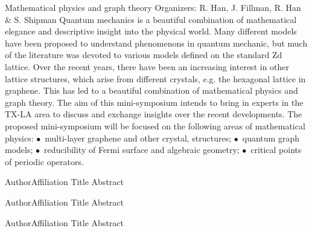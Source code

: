 \label{mini09}

\miniabs
{Mathematical physics and graph theory}
{Organizers: R. Han, J. Fillman, R. Han \& S. Shipman}
{Quantum mechanics is a beautiful combination of mathematical elegance and descriptive insight into the physical world. Many different models have been proposed to understand phenomenons in quantum mechanic, but much of the literature was devoted to various models defined on the standard Zd lattice. Over the recent years, there have been an increasing interest in other lattice structures, which arise from different crystals, e.g. the hexagonal lattice in graphene. This has led to a beautiful combination of mathematical physics and graph theory. The aim of this mini-symposium intends to bring in experts in the TX-LA area to discuss and exchange insights over the recent developments. The proposed mini-symposium will be focused on the following areas of mathematical physics: $\bullet$~multi-layer graphene and other crystal,  structures; $\bullet$~quantum graph models; $\bullet$~reducibility of Fermi surface and algebraic geometry; $\bullet$~critical points of periodic operators.}
\vspace{2ex}



\abs
{Author}{Affiliation}
{Title}
{Abstract
}

\vspace{1.5ex}

\abs
{Author}{Affiliation}
{Title}
{Abstract
}

\vspace{1.5ex}

\abs
{Author}{Affiliation}
{Title}
{Abstract
}
